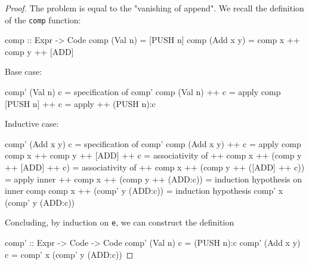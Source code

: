 \documentclass[12pt]{article}
\newenvironment{code}{\endgraf\verbatim}{\endverbatim}
\begin{document}
\begin{proof}
The problem is equal to the "vanishing of append". We recall the definition of the \verb|comp| function:

\begin{code}
comp :: Expr -> Code
comp (Val n) = [PUSH n]
comp (Add x y) = comp x ++ comp y ++ [ADD]
\end{code}

Base case:

\begin{code}
  comp' (Val n) c
=   { specification of comp' }
  comp (Val n) ++ c
=   { apply comp }
  [PUSH n] ++ c
=   { apply ++ }
  (PUSH n):c
\end{code}

Inductive case:

\begin{code}
  comp' (Add x y) c
=   { specification of comp' }
  comp (Add x y) ++ c
=   { apply comp }
  comp x ++ comp y ++ [ADD] ++ c
=   { associativity of ++ }
  comp x ++ (comp y ++ [ADD] ++ c)
=   { associativity of ++ }
  comp x ++ (comp y ++ ([ADD] ++ c))
=   { apply inner ++}
  comp x ++ (comp y ++ (ADD:c))
=   { induction hypothesis on inner comp }
  comp x ++ (comp' y (ADD:c))
=   { induction hypothesis }
  comp' x (comp' y (ADD:c))
\end{code}

Concluding, by induction on \verb|e|, we can construct the definition

\begin{code}
comp' :: Expr -> Code -> Code
comp' (Val n) c = (PUSH n):c
comp' (Add x y) c = comp' x (comp' y (ADD:c))
\end{code} 
\end{proof}
\end{document}
